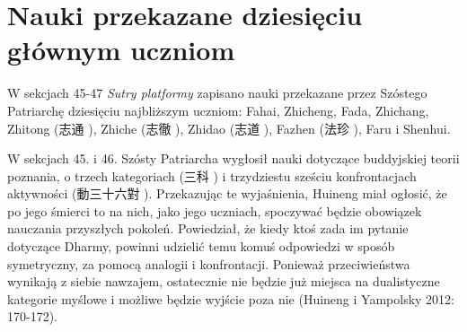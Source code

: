 \section{Nauki przekazane dziesięciu głównym uczniom}
W sekcjach 45-47 \textit{Sutry platformy} zapisano nauki przekazane przez Szóstego Patriarchę  dziesięciu najbliższym uczniom: Fahai, Zhicheng, Fada, Zhichang, Zhitong (志通 ), Zhiche (志徹 ), Zhidao (志道 ), Fazhen (法珍 ), Faru i Shenhui.

W sekcjach 45. i 46. Szósty Patriarcha wygłosił nauki dotyczące buddyjskiej teorii poznania, o trzech kategoriach (三科 ) i trzydziestu sześciu konfrontacjach aktywności (動三十六對 ). %
Przekazując te wyjaśnienia, Huineng miał ogłosić, że po jego śmierci to na nich, jako jego uczniach, spoczywać będzie obowiązek nauczania przyszłych pokoleń.
Powiedział, że kiedy ktoś zada im pytanie dotyczące Dharmy, powinni  udzielić temu komuś odpowiedzi w sposób symetryczny, za pomocą analogii i konfrontacji.
Ponieważ przeciwieństwa wynikają z siebie nawzajem, ostatecznie nie będzie już miejsca na dualistyczne kategorie myślowe i możliwe będzie wyjście poza nie
(Huineng i Yampolsky 2012: 170-172).

